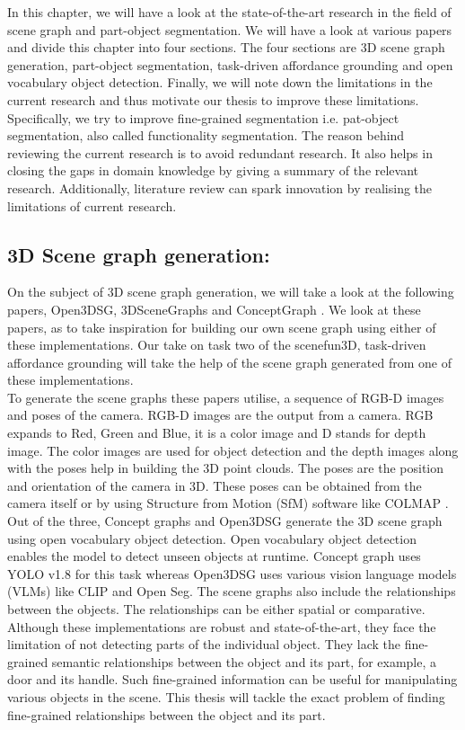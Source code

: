 In this chapter, we will have a look at the state-of-the-art research in the field of scene graph and part-object segmentation. We will have a look at various papers and divide this chapter into four sections. The four sections are 3D scene graph generation, part-object segmentation,
task-driven affordance grounding and open vocabulary object detection. Finally, we will note down the limitations in the current research and thus motivate our thesis to improve these limitations. Specifically, we try to improve fine-grained segmentation i.e. pat-object segmentation, also called functionality segmentation. The reason behind reviewing the current research is to avoid redundant research. It also helps in closing the gaps in domain knowledge by giving a summary of the relevant research. Additionally, literature review can spark innovation by realising
the limitations of current research.
 
 \subsection{3D Scene graph generation:}
On the subject of 3D scene graph generation, we will take a look at the following papers, 
Open3DSG\cite{koch2024open3dsgopenvocabulary3dscene}, 3DSceneGraphs \cite{armeni20193d} and ConceptGraph \cite{gu2023conceptgraphsopenvocabulary3dscene}. 
We look at these papers, as to take inspiration for building our own scene graph 
using either of these implementations. Our take on task two of the scenefun3D, task-driven affordance grounding will 
take the help of the scene graph generated from one of these implementations. \\
To generate the scene graphs these papers utilise,
a sequence of RGB-D images and poses of the camera. RGB-D images are the output from a camera.
RGB expands to Red, Green and Blue, it is a color image and D stands for depth image. The color images
are used for object detection and the depth images along with the poses help in building the 3D point clouds. The poses are
the position and orientation of the camera in 3D. These poses can be obtained from the camera itself or by using Structure from Motion (SfM) software like
COLMAP \cite{schoenberger2016mvs} \cite{schoenberger2016sfm}. \\ Out of the three, Concept graphs and 
Open3DSG generate the 3D scene graph using open vocabulary object detection. Open vocabulary
object detection enables the model to detect unseen objects at runtime. Concept graph uses YOLO v1.8 for this task whereas Open3DSG uses 
various vision language models (VLMs) like CLIP and Open Seg.
 The scene graphs also include the relationships between the 
objects. The relationships can be either spatial or comparative. \\
Although these implementations are robust and state-of-the-art, they face the limitation of not detecting
parts of the individual object. They lack the fine-grained semantic relationships between the object and its part, for example, a door and its handle.
Such fine-grained information can be useful for manipulating various objects in the scene. This thesis will tackle the exact problem of 
finding fine-grained relationships between the object and its part.

